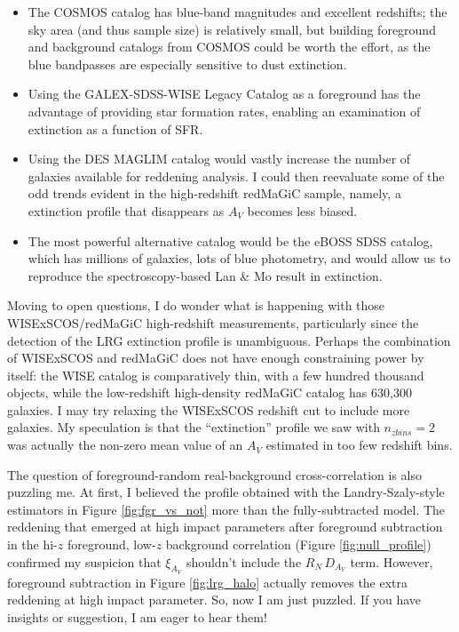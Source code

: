 \documentclass[11pt, oneside]{article}   	%
\begin{document}
\begin{itemize}
\item The COSMOS catalog has blue-band magnitudes and excellent redshifts; the sky area (and thus sample size) is relatively small, but building foreground and background catalogs from COSMOS could be worth the effort, as the blue bandpasses are especially sensitive to dust extinction. 
\item Using the GALEX-SDSS-WISE Legacy Catalog as a foreground has the advantage of providing star formation rates, enabling an examination of extinction as a function of SFR. 
\item Using the DES MAGLIM catalog would vastly increase the number of galaxies available for reddening analysis. I could then reevaluate some of the odd trends evident in the high-redshift redMaGiC sample, namely, a extinction profile that disappears as $A_V$ becomes less biased.
\item The most powerful alternative catalog would be the eBOSS SDSS catalog, which has millions of galaxies, lots of blue photometry, and would allow us to reproduce the spectroscopy-based Lan \& Mo result in extinction. 
\end{itemize} 

Moving to open questions, I do wonder what is happening with those WISExSCOS/redMaGiC high-redshift measurements, particularly since the detection of the LRG extinction profile is unambiguous. Perhaps the combination of WISExSCOS and redMaGiC does not have enough constraining power by itself: the WISE catalog is comparatively thin, with a few hundred thousand objects, while the low-redshift high-density redMaGiC catalog has 630,300 galaxies. I may try relaxing the WISExSCOS redshift cut to include more galaxies. My speculation is that the ``extinction'' profile we saw with $n_{zbins} = 2$ was actually the non-zero mean value of an $A_V$ estimated in too few redshift bins. 

The question of foreground-random real-background cross-correlation is also puzzling me. At first, I believed the profile obtained with the Landry-Szaly-style estimators in Figure \ref{fig:fgr_vs_not} more than the fully-subtracted model. The reddening that emerged at high impact parameters after foreground subtraction in the hi-$z$ foreground, low-$z$ background correlation (Figure \ref{fig:null_profile}) confirmed my suspicion that $\xi_{A_V}$ shouldn't include the $R_N\,D_{A_V}$ term. However, foreground subtraction in Figure \ref{fig:lrg_halo} actually removes the extra reddening at high impact parameter. So, now I am just puzzled. If you have insights or suggestion, I am eager to hear them! 
\end{document}
